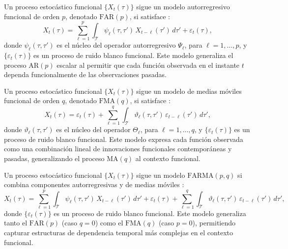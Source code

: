\begin{definition} Un proceso estocástico funcional $\{X_t(\tau)\}$ sigue un modelo autorregresivo funcional de orden $p$, denotado $\mathrm{FAR}(p)$, si satisface \citep{02_02_bosq2000linear, 02_02_aue2015prediction}:
\begin{equation}
    X_t(\tau) = \sum_{\ell=1}^{p} \int_{\mathcal{T}} \psi_\ell(\tau, \tau')\,
    X_{t-\ell}(\tau')\, d\tau' + \varepsilon_t(\tau),
\end{equation}
donde $\psi_\ell(\tau, \tau')$ es el núcleo del operador autorregresivo $\Psi_\ell$, para $\ell = 1, \dots, p$, y $\{\varepsilon_t(\tau)\}$ es un proceso de ruido blanco funcional. Este modelo generaliza el proceso $\mathrm{AR}(p)$ escalar al permitir que cada función observada en el instante $t$ dependa funcionalmente de las observaciones pasadas.
\end{definition}

\begin{definition} Un proceso estocástico funcional $\{X_t(\tau)\}$ sigue un modelo de medias móviles funcional de orden $q$, denotado $\mathrm{FMA}(q)$, si satisface \citep{02_02_klepsch2017innovations}:
\begin{equation}
    X_t(\tau) = \varepsilon_t(\tau) + \sum_{\ell=1}^{q} \int_{\mathcal{T}}
    \vartheta_\ell(\tau, \tau')\, \varepsilon_{t-\ell}(\tau')\, d\tau',
\end{equation}
donde $\vartheta_\ell(\tau, \tau')$ es el núcleo del operador $\Theta_\ell$, para $\ell = 1, \dots, q$, y $\{\varepsilon_t(\tau)\}$ es un proceso de ruido blanco funcional. Este modelo expresa cada función observada como una combinación lineal de innovaciones funcionales contemporáneas y pasadas, generalizando el proceso $\mathrm{MA}(q)$ al contexto funcional.
\end{definition}

\begin{definition}
Un proceso estocástico funcional $\{X_t(\tau)\}$ sigue un modelo $\mathrm{FARMA}(p,q)$ si combina componentes autorregresivas y de medias móviles \citep{02_02_klepsch2017prediction}:
\begin{equation}
    X_t(\tau) = \sum_{\ell=1}^{p} \int_{\mathcal{T}} \psi_\ell(\tau, \tau')\,
    X_{t-\ell}(\tau')\, d\tau'
    + \varepsilon_t(\tau)
    + \sum_{\ell=1}^{q} \int_{\mathcal{T}} \vartheta_\ell(\tau, \tau')\,
    \varepsilon_{t-\ell}(\tau')\, d\tau',
\end{equation}
donde $\{\varepsilon_t(\tau)\}$ es un proceso de ruido blanco funcional. Este modelo generaliza tanto el $\mathrm{FAR}(p)$ (caso $q = 0$) como el $\mathrm{FMA}(q)$ (caso $p = 0$), permitiendo capturar estructuras de dependencia temporal más complejas en el contexto funcional.
\end{definition}

